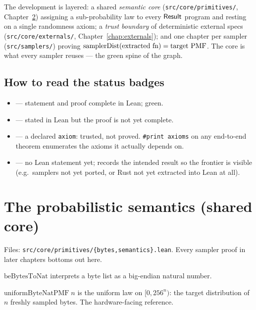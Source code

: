 The development is layered: a shared \emph{semantic core}
(\texttt{src/core/primitives/}, Chapter~\ref{chap:foundation}) assigning a
sub-probability law to every \(\mathsf{Result}\) program and resting on a single
randomness axiom; a \emph{trust boundary} of deterministic external specs
(\texttt{src/core/externals/}, Chapter~\ref{chap:externals}); and one chapter per
sampler (\texttt{src/samplers/}) proving \(\mathrm{samplerDist}(\text{extracted fn}) =
\text{target PMF}\). The core is what every sampler reuses --- the green spine of
the graph.

\section{How to read the status badges}

\begin{itemize}
  \item \statusDone{} --- statement and proof complete in Lean; green.
  \item \statusGap{} --- stated in Lean but the proof is not yet complete.
  \item \statusAxiom{} --- a declared \texttt{axiom}: trusted, not proved.
    \texttt{\#print axioms} on any end-to-end theorem enumerates the axioms it
    actually depends on.
  \item \statusStub{} --- no Lean statement yet; records the intended result so
    the frontier is visible (e.g.\ samplers not yet ported, or Rust not yet
    extracted into Lean at all).
\end{itemize}

\chapter{The probabilistic semantics (shared core)}\label{chap:foundation}

Files: \texttt{src/core/primitives/\{bytes,semantics\}.lean}. Every sampler proof
in later chapters bottoms out here.

\begin{definition}\label{def:beBytesToNat}
  \leanok
  \(\mathrm{beBytesToNat}\) interprets a byte list as a big-endian natural
  number. \statusDone
\end{definition}

\begin{definition}\label{def:uniformByteNatPMF}
  \leanok
  \(\mathrm{uniformByteNatPMF}\;n\) is the uniform law on \([0, 256^n)\): the
  target distribution of \(n\) freshly sampled bytes. The hardware-facing
  reference. \statusDone
\end{definition}

